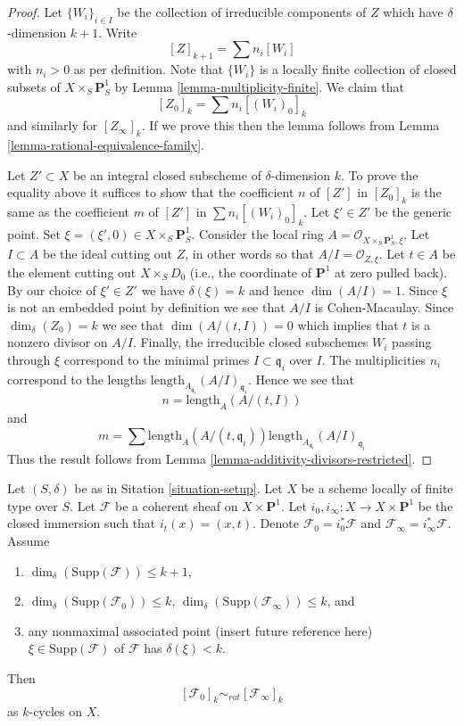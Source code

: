 \begin{proof}
Let $\{W_i\}_{i \in I}$ be the collection of irreducible
components of $Z$ which have $\delta$-dimension $k + 1$.
Write
$$
[Z]_{k + 1} = \sum n_i[W_i]
$$
with $n_i > 0$ as per definition. Note that $\{W_i\}$
is a locally finite collection of closed subsets of
$X \times_S \mathbf{P}^1_S$ by Lemma \ref{lemma-multiplicity-finite}.
We claim that
$$
[Z_0]_k = \sum n_i[(W_i)_0]_k
$$
and similarly for $[Z_\infty]_k$. If we prove this then the lemma
follows from Lemma \ref{lemma-rational-equivalence-family}.

\medskip\noindent
Let $Z' \subset X$ be an integral closed subscheme of $\delta$-dimension $k$.
To prove the equality above it suffices to show that the coefficient $n$
of $[Z']$ in $[Z_0]_k$ is the same as the coefficient $m$ of
$[Z']$ in $\sum n_i[(W_i)_0]_k$. Let $\xi' \in Z'$ be the generic point.
Set $\xi = (\xi', 0) \in  X \times_S \mathbf{P}^1_S$.
Consider the local ring $A = \mathcal{O}_{X \times_S \mathbf{P}^1_S, \xi}$.
Let $I \subset A$ be the ideal cutting out $Z$, in other words so that
$A/I = \mathcal{O}_{Z, \xi}$. Let $t \in A$ be the element cutting
out $X \times_S D_0$ (i.e., the coordinate of $\mathbf{P}^1$ at zero
pulled back). By our choice of $\xi' \in Z'$ we have $\delta(\xi) = k$
and hence $\dim(A/I) = 1$. Since $\xi$ is not an embedded point by
definition we see that $A/I$ is Cohen-Macaulay. Since $\dim_\delta(Z_0)
= k$ we see that $\dim(A/(t, I)) = 0$ which implies that $t$
is a nonzero divisor on $A/I$. Finally, the irreducible closed subschemes
$W_i$ passing through $\xi$ correspond to the minimal primes
$I \subset \mathfrak q_i$ over $I$. The multiplicities $n_i$ correspond
to the lengths $\text{length}_{A_{\mathfrak q_i}}(A/I)_{\mathfrak q_i}$.
Hence we see that
$$
n = \text{length}_A(A/(t, I))
$$
and
$$
m = \sum
\text{length}_A(A/(t, \mathfrak q_i)) 
\text{length}_{A_{\mathfrak q_i}}(A/I)_{\mathfrak q_i}
$$
Thus the result follows from
Lemma \ref{lemma-additivity-divisors-restricted}.
\end{proof}

\begin{lemma}
\label{lemma-coherent-sheaf-cross-p1}
Let $(S, \delta)$ be as in Sitation \ref{situation-setup}.
Let $X$ be a scheme locally of finite type over $S$.
Let $\mathcal{F}$ be a coherent sheaf on $X \times \mathbf{P}^1$.
Let $i_0, i_\infty : X \to X \times \mathbf{P}^1$ be the closed immersion
such that $i_t(x) = (x, t)$. Denote $\mathcal{F}_0 = i_0^*\mathcal{F}$ and
$\mathcal{F}_\infty = i_\infty^*\mathcal{F}$.
Assume
\begin{enumerate}
\item $\dim_\delta(\text{Supp}(\mathcal{F})) \leq k + 1$,
\item $\dim_\delta(\text{Supp}(\mathcal{F}_0)) \leq k$,
$\dim_\delta(\text{Supp}(\mathcal{F}_\infty)) \leq k$, and
\item any nonmaximal associated point
(insert future reference here) $\xi \in \text{Supp}(\mathcal{F})$
of $\mathcal{F}$ has $\delta(\xi) < k$.
\end{enumerate}
Then
$$
[\mathcal{F}_0]_k \sim_{rat} [\mathcal{F}_\infty]_k
$$
as $k$-cycles on $X$.
\end{lemma}

